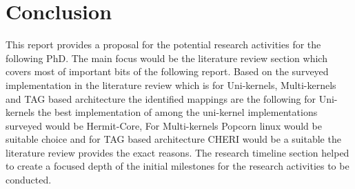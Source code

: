 
\chapter{Conclusion}  %
This report provides a proposal for the potential research 
activities for the following PhD. The main focus would be 
the literature review section which covers most of important 
bits of the following report. Based on the surveyed implementation 
in the literature review which is for Uni-kernels, Multi-kernels 
and TAG based architecture the identified mappings are the following 
for Uni-kernels the best implementation of among the uni-kernel 
implementations surveyed would be Hermit-Core, For Multi-kernels 
Popcorn linux would be suitable choice and for TAG based architecture
CHERI would be a suitable the literature review 
provides the exact reasons. The research timeline section helped
to create a focused depth of the initial milestones for the research 
activities to be conducted.